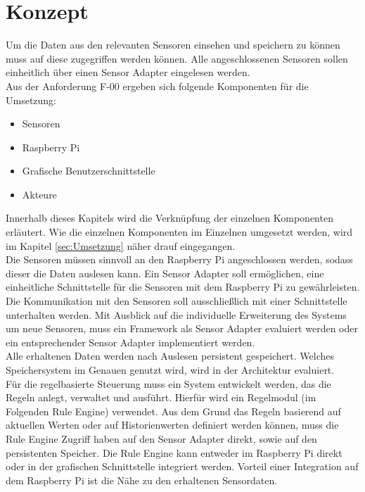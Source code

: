 \section{Konzept}
Um die Daten aus den relevanten Sensoren einsehen und speichern zu können muss auf diese zugegriffen werden können. Alle angeschlossenen Sensoren sollen einheitlich über einen Sensor Adapter eingelesen werden.\\
Aus der Anforderung F-00 ergeben sich folgende Komponenten für die Umsetzung:
\begin{itemize}
\item Sensoren
\item Raspberry Pi
\item Grafische Benutzerschnittstelle
\item Akteure
\end{itemize}
Innerhalb dieses Kapitels wird die Verknüpfung der einzelnen Komponenten erläutert. Wie die einzelnen Komponenten im Einzelnen umgesetzt werden, wird im Kapitel \ref{sec:Umsetzung} näher drauf eingegangen.\\
Die Sensoren müssen sinnvoll an den Raspberry Pi angeschlossen werden, sodass dieser die Daten auslesen kann. Ein Sensor Adapter soll ermöglichen, eine einheitliche Schnittstelle für die Sensoren mit dem Raspberry Pi zu gewährleisten. Die Kommunikation mit den Sensoren soll ausschließlich mit einer Schnittstelle unterhalten werden. Mit Ausblick auf die individuelle Erweiterung des Systems um neue Sensoren, muss ein Framework als Sensor Adapter evaluiert werden oder ein entsprechender Sensor Adapter implementiert werden.\\
Alle erhaltenen Daten werden nach Auslesen persistent gespeichert. Welches Speichersystem im Genauen genutzt wird, wird in der Architektur evaluiert.\\
Für die regelbasierte Steuerung muss ein System entwickelt werden, das die Regeln anlegt, verwaltet und ausführt. Hierfür wird ein Regelmodul (im Folgenden Rule Engine) verwendet. Aus dem Grund das Regeln basierend auf aktuellen Werten oder auf Historienwerten definiert werden können, muss die Rule Engine Zugriff haben auf den Sensor Adapter direkt, sowie auf den persistenten Speicher. Die Rule Engine kann entweder im Raspberry Pi direkt oder in der grafischen Schnittstelle integriert werden. Vorteil einer Integration auf dem Raspberry Pi ist die Nähe zu den erhaltenen Sensordaten.\\

